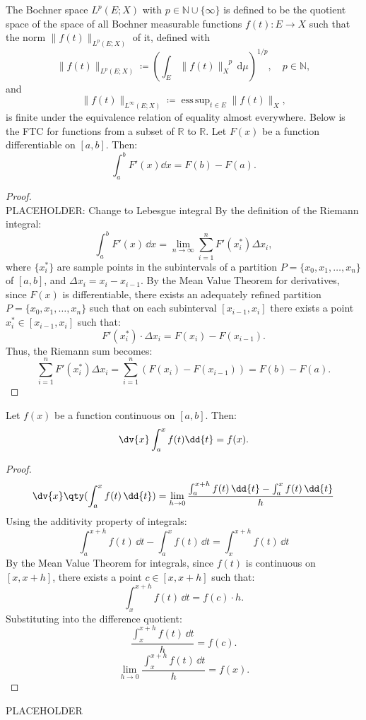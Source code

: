 \documentclass[a4paper,12pt]{report}
\begin{document}
\begin{itemize}
\begin{itemize}
The Bochner space $L^p(E;X)$ with $p\in\mathbb{N}\cup\{\infty\}$ is defined to be the quotient space of the space of all Bochner measurable functions $f(t)\colon E\to X$ such that the norm $\|f(t)\|_{L^p(E;X)}$ of it, defined with
\[\|f(t)\|_{L^p(E;X)}\coloneq\left(\int_E\|f(t)\|_X^{\phantom{X}p}\,\mathrm{d}\mu\right)^{1/p},\quad p\in\mathbb{N},\]
and
\[\|f(t)\|_{L^{\infty }(E;X)}\coloneq\operatorname{ess\,sup}_{t\in E}\|f(t)\|_{X},\]
is finite under the equivalence relation of equality almost everywhere.
Below is the FTC for functions from a subset of $\mathbb{R}$ to $\mathbb{R}$.
Let $F(x)$ be a function differentiable on $[a,b]$. Then:
\[\int_a^bF'(x)\dd{x}=F(b)-F(a).\]
\begin{proof}\mbox{}\\
PLACEHOLDER: Change to Lebesgue integral
By the definition of the Riemann integral:
\[
\int_a^b F'(x)\, \dd{x} = \lim_{n \to \infty} \sum_{i=1}^n F'(x_i^*) \Delta x_i,
\]
where \( \{x_i^*\} \) are sample points in the subintervals of a partition \( P = \{x_0, x_1, \dots, x_n\} \) of \([a, b]\), and \( \Delta x_i = x_i - x_{i-1} \).
By the Mean Value Theorem for derivatives, since \( F(x) \) is differentiable, there exists an adequately refined partition \( P = \{x_0, x_1, \dots, x_n\} \) such that on each subinterval \([x_{i-1}, x_i]\) there exists a point \( x_i^* \in [x_{i-1}, x_i] \) such that:
\[
F'(x_i^*) \cdot \Delta x_i = F(x_i) - F(x_{i-1}).
\]
Thus, the Riemann sum becomes:
\[
\sum_{i=1}^n F'(x_i^*) \Delta x_i = \sum_{i=1}^n \left(F(x_i) - F(x_{i-1})\right) = F(b) - F(a).
\]
\end{proof}
Let $f(x)$ be a function continuous on $[a,b]$. Then:
\[\dv{x}\int_a^xf(t)\dd{t}=f(x).\]
\begin{proof}
\[\dv{x}\qty(\int_a^xf(t)\,\dd{t})=\lim_{h\to 0}\frac{\int_a^{x+h}f(t)\,\dd{t}-\int_a^xf(t)\,\dd{t}}{h}\]
Using the additivity property of integrals:
\[\int_a^{x+h}f(t)\,\dd{t}-\int_a^xf(t)\,\dd{t}=\int_x^{x+h}f(t)\,\dd{t}\]
By the Mean Value Theorem for integrals, since \(f(t)\) is continuous on \([x,x+h]\), there exists a point \(c\in [x,x+h]\) such that:
\[\int_x^{x+h} f(t)\, \dd{t} = f(c) \cdot h.\]
Substituting into the difference quotient:
\[\frac{\int_x^{x+h}f(t)\,\dd{t}}{h} = f(c).\]
\[\lim_{h\to 0}\frac{\int_x^{x+h}f(t)\,\dd{t}}{h} = f(x).\]
\end{proof}
PLACEHOLDER




\end{itemize}
\end{itemize}
\end{document}
